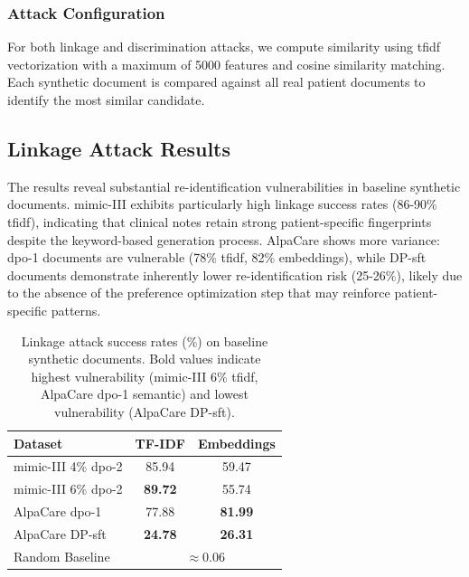 \subsubsection{Attack Configuration}

For both linkage and discrimination attacks, we compute similarity using \gls{tfidf} vectorization with a maximum of \num{5000} features and cosine similarity matching. Each synthetic document is compared against all real patient documents to identify the most similar candidate.


\subsection{Linkage Attack Results}

The results reveal substantial re-identification vulnerabilities in baseline synthetic documents. \gls{mimic}-III exhibits particularly high linkage success rates (86-90\% \gls{tfidf}), indicating that clinical notes retain strong patient-specific fingerprints despite the keyword-based generation process. AlpaCare shows more variance: \gls{dpo}-1 documents are vulnerable (78\% \gls{tfidf}, 82\% embeddings), while DP-\gls{sft} documents demonstrate inherently lower re-identification risk (25-26\%), likely due to the absence of the preference optimization step that may reinforce patient-specific patterns.

\begin{table}[h]
\centering
\begin{tabular}{lcc}
\toprule
\textbf{Dataset} & \textbf{TF-IDF} & \textbf{Embeddings} \\
\midrule
\gls{mimic}-III 4\% \gls{dpo}-2 & 85.94 & 59.47 \\
\gls{mimic}-III 6\% \gls{dpo}-2 & \textbf{89.72} & 55.74 \\
AlpaCare \gls{dpo}-1 & 77.88 & \textbf{81.99} \\
AlpaCare DP-\gls{sft} & \textbf{24.78} & \textbf{26.31} \\
\midrule
Random Baseline & \multicolumn{2}{c}{$\approx$0.06} \\
\bottomrule
\end{tabular}
\caption{Linkage attack success rates (\%) on baseline synthetic documents. Bold values indicate highest vulnerability (\gls{mimic}-III 6\% \gls{tfidf}, AlpaCare \gls{dpo}-1 semantic) and lowest vulnerability (AlpaCare DP-\gls{sft}).}
\label{tab:baseline_linkage}
\end{table}

